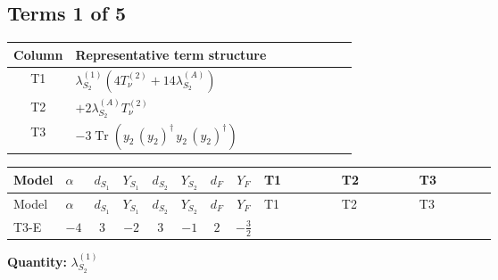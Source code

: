 \documentclass[8pt]{article}
\begin{document}
\begin{landscape}
\subsection*{Terms 1 of 5}
\begin{center}
\begin{tabular}{@{}c >{\raggedright\arraybackslash}p{0.82\linewidth}@{}}
\toprule
Column & Representative term structure \\
\midrule
T1 & \(\displaystyle {\lambda_{S_2}^{(1)}} (4 T_{\nu}^{(2)}+14 {\lambda_{S_2}^{(A)}})\) \\
\midrule
T2 & \(\displaystyle +2 {\lambda_{S_2}^{(A)}} T_{\nu}^{(2)}\) \\
\midrule
T3 & \(\displaystyle -3 \operatorname{Tr}\!\left({y_2}\,\left({y_2}\right)^{\dagger}\,{y_2}\,\left({y_2}\right)^{\dagger}\right)\) \\
\midrule
\bottomrule
\end{tabular}
\end{center}
\smallskip
\tiny
\begin{longtable}{@{}llcccccc >{\raggedright\arraybackslash}p{0.21\linewidth} >{\raggedright\arraybackslash}p{0.21\linewidth} >{\raggedright\arraybackslash}p{0.21\linewidth}@{}}
\toprule
Model & $\alpha$ & $d_{S_1}$ & $Y_{S_1}$ & $d_{S_2}$ & $Y_{S_2}$ & $d_F$ & $Y_F$ & T1 & T2 & T3 \\
\midrule
\endfirsthead
\toprule
Model & $\alpha$ & $d_{S_1}$ & $Y_{S_1}$ & $d_{S_2}$ & $Y_{S_2}$ & $d_F$ & $Y_F$ & T1 & T2 & T3 \\
\midrule
\endhead
T3-E & $-4$ & $3$ & $-2$ & $3$ & $-1$ & $2$ & $-\frac{3}{2}$ & \scriptsize\adjustbox{max width=\linewidth}{$\begin{gathered} {\lambda_{S_2}^{(1)}} (4 T_{\nu}^{(2)}+14 {\lambda_{S_2}^{(A)}})\end{gathered}$} & \scriptsize\adjustbox{max width=\linewidth}{$\begin{gathered} +2 {\lambda_{S_2}^{(A)}} T_{\nu}^{(2)}\end{gathered}$} & \scriptsize\adjustbox{max width=\linewidth}{$\begin{gathered} -3 \operatorname{Tr}\!\left({y_2}\,\left({y_2}\right)^{\dagger}\,{y_2}\,\left({y_2}\right)^{\dagger}\right)\end{gathered}$} \\
\midrule
\bottomrule
\end{longtable}
\clearpage
\noindent\textbf{Quantity: }$\lambda_{S_2}^{(1)}$\par\smallskip

\end{landscape}
\end{document}
